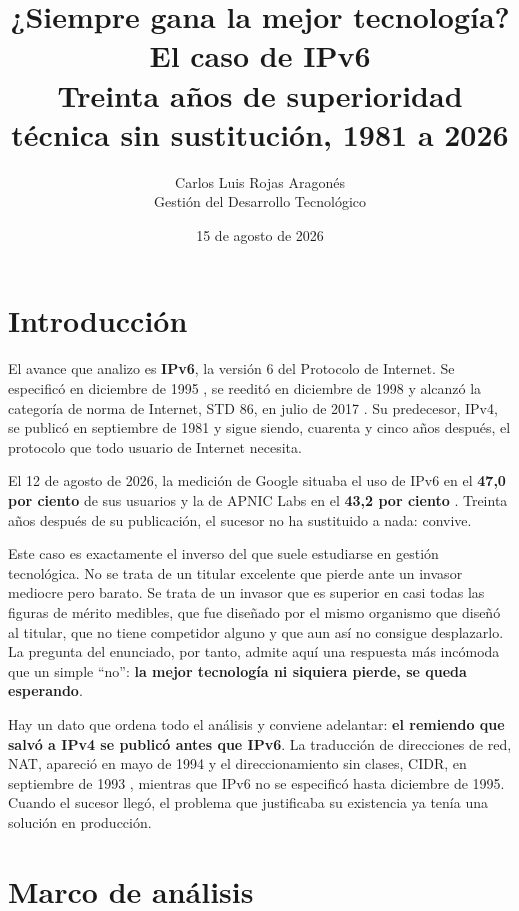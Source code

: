 \documentclass[11pt,letterpaper]{article}
\title{\vspace{-1.2cm}\textbf{¿Siempre gana la mejor tecnología? El caso de
IPv6}\\
\large Treinta años de superioridad técnica sin sustitución, 1981 a 2026}
\author{Carlos Luis Rojas Aragonés\\
\small Gestión del Desarrollo Tecnológico}
\date{\small 15 de agosto de 2026}
\begin{document}
\maketitle
\vspace{-0.6em}

\section{Introducción}

El avance que analizo es \textbf{IPv6}, la versión 6 del Protocolo de Internet.
Se especificó en diciembre de 1995 \parencite{rfc1883}, se reeditó en diciembre
de 1998 \parencite{rfc2460} y alcanzó la categoría de norma de Internet, STD 86,
en julio de 2017 \parencite{rfc8200}. Su predecesor, IPv4, se publicó en
septiembre de 1981 \parencite{rfc791} y sigue siendo, cuarenta y cinco años
después, el protocolo que todo usuario de Internet necesita.

El 12 de agosto de 2026, la medición de Google situaba el uso de IPv6 en el
\textbf{47,0 por ciento} de sus usuarios \parencite{googlev6} y la de APNIC Labs
en el \textbf{43,2 por ciento} \parencite{apnicv6}. Treinta años después de su
publicación, el sucesor no ha sustituido a nada: convive.

Este caso es exactamente el inverso del que suele estudiarse en gestión
tecnológica. No se trata de un titular excelente que pierde ante un invasor
mediocre pero barato. Se trata de un invasor que es superior en casi todas las
figuras de mérito medibles, que fue diseñado por el mismo organismo que diseñó
al titular, que no tiene competidor alguno y que aun así no consigue desplazarlo.
La pregunta del enunciado, por tanto, admite aquí una respuesta más incómoda que
un simple \enquote{no}: \textbf{la mejor tecnología ni siquiera pierde, se queda
esperando}.

Hay un dato que ordena todo el análisis y conviene adelantar: \textbf{el remiendo
que salvó a IPv4 se publicó antes que IPv6}. La traducción de direcciones de red,
NAT, apareció en mayo de 1994 \parencite{rfc1631} y el direccionamiento sin
clases, CIDR, en septiembre de 1993 \parencite{rfc1519}, mientras que IPv6 no se
especificó hasta diciembre de 1995. Cuando el sucesor llegó, el problema que
justificaba su existencia ya tenía una solución en producción.

\section{Marco de análisis}
\end{document}
